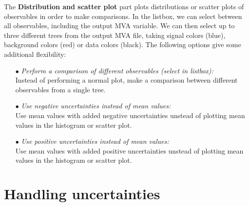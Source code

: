 \documentclass[12pt,a4paper]{report}
\begin{document}
The \textbf{Distribution and scatter plot} part plots distributions or scatter plots of observables in order to make comparisons. In the listbox, we can select between all observables, including the output MVA variable. We can then select up to three different trees from the output MVA file, taking signal colors (blue), background colors (red) or data colors (black). The following options give some additional flexibility:
\begin{itemize}
\item[$\bullet$] \emph{Perform a comparison of different observables (select in listbox):}\\Instead of performing a normal plot, make a comparison between different observables from a single tree.
\item[$\bullet$] \emph{Use negative uncertainties instead of mean values:}\\Use mean values with added negative uncertainties unstead of plotting mean values in the histogram or scatter plot.
\item[$\bullet$] \emph{Use positive uncertainties instead of mean values:}\\Use mean values with added positive uncertainties unstead of plotting mean values in the histogram or scatter plot.
\end{itemize}

\section{Handling uncertainties} \label{ch:uncert}
\end{document}
